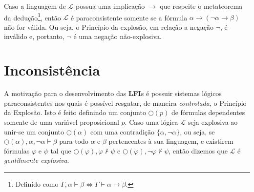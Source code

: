 Caso a linguagem de $\mathcal{L}$ possua uma implicação $\rightarrow$ que respeite o metateorema da dedução\footnote{Definido como $\Gamma, \alpha \vdash \beta \Longleftrightarrow \Gamma\vdash \alpha \rightarrow \beta$.}, então $\mathcal{L}$ é paraconsistente somente se a fórmula $\alpha \rightarrow (\neg \alpha \rightarrow \beta)$ não for válida. Ou seja, o Princípio da explosão, em relação a negação $\neg$, é inválido e, portanto, $\neg$ é uma negação não-explosiva.

\section{Inconsistência}
A motivação para o desenvolvimento das \textbf{LFI}s é possuir sistemas lógicos paraconsistentes nos quais é possível resgatar, de maneira \textit{controlada}, o Princípio da Explosão. Isto é feito definindo um conjunto $\bigcirc(p)$ de fórmulas dependentes somente de uma variável proposicional $p$. Caso uma lógica $\mathcal{L}$ seja explosiva ao unir-se um conjunto $\bigcirc(\alpha)$ com uma contradição $\{\alpha, \neg \alpha\}$, ou seja, se $\bigcirc(\alpha), \alpha, \neg \alpha \vdash \beta$ para todo $\alpha$ e $\beta$ pertencentes à sua linguagem, e existirem fórmulas $\varphi$ e $\psi$ tal que $\bigcirc(\varphi), \varphi \nvdash \psi$ e $\bigcirc(\varphi), \neg \varphi \nvdash \psi$, então dizemos que $\mathcal{L}$ é \textit{gentilmente explosiva}. 

